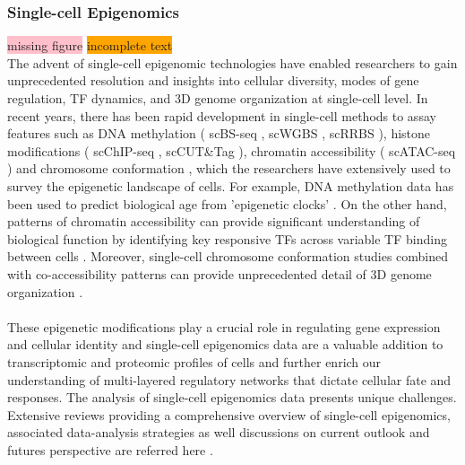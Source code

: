 \subsubsection{Single-cell Epigenomics}
\colorbox{pink}{missing figure} \colorbox{orange}{incomplete text}\\
The advent of single-cell epigenomic technologies have enabled researchers to gain unprecedented resolution and insights into cellular diversity, modes of gene regulation, TF dynamics, and 3D genome organization at single-cell level. In recent years, there has been rapid development in single-cell methods to assay features such as DNA methylation ( scBS-seq \textbf{\cite{smallwood_single-cell_2014}}, scWGBS \textbf{\cite{farlik_single-cell_2015}}, scRRBS \textbf{\cite{guo_single-cell_2013}} ), histone modifications ( scChIP-seq \textbf{\cite{grosselin_high-throughput_2019}}, scCUT\&Tag \textbf{\cite{kaya-okur_cuttag_2019,wu_single-cell_2021}} ), chromatin accessibility ( scATAC-seq \textbf{\cite{chen_rapid_2018,xu_plate-based_2021,buenrostro_single-cell_2015,satpathy_massively_2019}} )  and chromosome conformation \textbf{\cite{stevens_3d_2017,dekker_capturing_2002}}, which the researchers have extensively used to survey the epigenetic landscape of cells. For example, DNA methylation data has been used to predict biological age from ’epigenetic clocks’ \textbf{\cite{horvath_dna_2018}}. On the other hand, patterns of chromatin accessibility can provide significant understanding of biological function by identifying key responsive TFs across variable TF binding between cells \textbf{\cite{buenrostro_single-cell_2015}}. Moreover, single-cell chromosome conformation studies combined with co-accessibility patterns can provide unprecedented detail of 3D genome organization \textbf{\cite{mazan-mamczarz_single-cell_2022}}.\\\\
These epigenetic modifications play a crucial role in regulating gene expression and cellular identity and single-cell epigenomics data are a valuable addition to transcriptomic and proteomic profiles of cells and further enrich our understanding of multi-layered regulatory networks that dictate cellular fate and responses. The analysis of single-cell epigenomics data presents unique challenges. Extensive reviews providing a comprehensive overview of single-cell epigenomics, associated data-analysis strategies as well discussions on current outlook and futures perspective are referred here \textbf{\cite{preissl_characterizing_2023}}.


